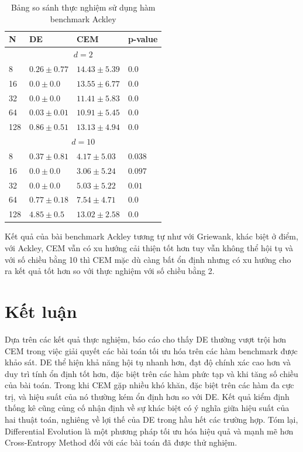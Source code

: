 \documentclass[10pt]{report}
\begin{document}
\begin{table}[H]\centering
	\caption{Bảng so sánh thực nghiệm sử dụng hàm benchmark Ackley}
	\begin{tabularx}{0.8\textwidth}{p{5em}XXl}
		\toprule
		\textbf{N} & \textbf{DE}                & \textbf{CEM}       & \textbf{p-value}   \\
		\midrule
		\multicolumn{4}{c}{\(d = 2\)}                                                     \\
		\midrule
		8          & \(\mathbf{0.26 \pm 0.77}\) & \(14.43 \pm 5.39\) & \(\mathbf{0.0}\)   \\
		16         & \(\mathbf{0.0 \pm 0.0}\)   & \(13.55 \pm 6.77\) & \(\mathbf{0.0}\)   \\
		32         & \(\mathbf{0.0 \pm 0.0}\)   & \(11.41 \pm 5.83\) & \(\mathbf{0.0}\)   \\
		64         & \(\mathbf{0.03 \pm 0.01}\) & \(10.91 \pm 5.45\) & \(\mathbf{0.0}\)   \\
		128        & \(\mathbf{0.86 \pm 0.51}\) & \(13.13 \pm 4.94\) & \(\mathbf{0.0}\)   \\
		\midrule
		\multicolumn{4}{c}{\(d = 10\)}                                                    \\
		\midrule
		8          & \(\mathbf{0.37 \pm 0.81}\) & \(4.17 \pm 5.03\)  & \(\mathbf{0.038}\) \\
		16         & \(\mathbf{0.0 \pm 0.0}\)   & \(3.06 \pm 5.24\)  & \(0.097\)          \\
		32         & \(\mathbf{0.0 \pm 0.0}\)   & \(5.03 \pm 5.22\)  & \(\mathbf{0.01}\)  \\
		64         & \(\mathbf{0.77 \pm 0.18}\) & \(7.54 \pm 4.71\)  & \(\mathbf{0.0}\)   \\
		128        & \(\mathbf{4.85 \pm 0.5}\)  & \(13.02 \pm 2.58\) & \(\mathbf{0.0}\)   \\
		\bottomrule
	\end{tabularx}
\end{table}

Kết quả của bài benchmark Ackley tương tự như với Griewank, khác biệt ở điểm, với Ackley, CEM vẫn có xu hướng cải thiện tốt hơn tuy vẫn không thể hội tụ và với số chiều bằng 10 thì CEM mặc dù càng bất ổn định nhưng có xu hướng cho ra kết quả tốt hơn so với thực nghiệm với số chiều bằng 2.

\chapter{Kết luận}
Dựa trên các kết quả thực nghiệm, báo cáo cho thấy DE thường vượt trội hơn CEM trong việc giải quyết các bài toán tối ưu hóa trên các hàm benchmark được khảo sát. DE thể hiện khả năng hội tụ nhanh hơn, đạt độ chính xác cao hơn và duy trì tính ổn định tốt hơn, đặc biệt trên các hàm phức tạp và khi tăng số chiều của bài toán. Trong khi CEM gặp nhiều khó khăn, đặc biệt trên các hàm đa cực trị, và hiệu suất của nó thường kém ổn định hơn so với DE. Kết quả kiểm định thống kê cũng củng cố nhận định về sự khác biệt có ý nghĩa giữa hiệu suất của hai thuật toán, nghiêng về lợi thế của DE trong hầu hết các trường hợp. Tóm lại, Differential Evolution là một phương pháp tối ưu hóa hiệu quả và mạnh mẽ hơn Cross-Entropy Method đối với các bài toán đã được thử nghiệm.
\end{document}
